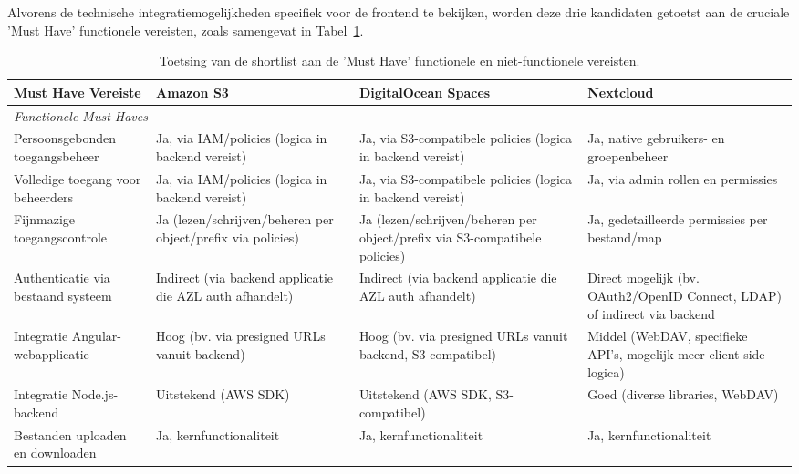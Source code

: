 Alvorens de technische integratiemogelijkheden specifiek voor de frontend te bekijken, worden deze drie kandidaten getoetst aan de cruciale 'Must Have' functionele vereisten, zoals samengevat in Tabel~\ref{tab:musthave-vergelijking}.

\begin{table}[H]
    \centering
    \footnotesize
    \caption[Toetsing shortlist aan Must Have vereisten]{\label{tab:musthave-vergelijking}Toetsing van de shortlist aan de 'Must Have' functionele en niet-functionele vereisten.} %
    \begin{tabular}{l p{3.5cm} p{3.5cm} p{3.5cm}}
      \toprule
      \textbf{Must Have Vereiste} & \textbf{Amazon S3} & \textbf{DigitalOcean Spaces} & \textbf{Nextcloud} \\
      \midrule
      \multicolumn{4}{l}{\textit{Functionele Must Haves}} \\ %
      Persoonsgebonden toegangsbeheer & Ja, via IAM/policies (logica in backend vereist) & Ja, via S3-compatibele policies (logica in backend vereist) & Ja, native gebruikers- en groepenbeheer \\
      \midrule
      Volledige toegang voor beheerders & Ja, via IAM/policies (logica in backend vereist) & Ja, via S3-compatibele policies (logica in backend vereist) & Ja, via admin rollen en permissies \\
      \midrule
      Fijnmazige toegangscontrole & Ja (lezen/schrijven/beheren per object/prefix via policies) & Ja (lezen/schrijven/beheren per object/prefix via S3-compatibele policies) & Ja, gedetailleerde permissies per bestand/map \\
      \midrule
      Authenticatie via bestaand systeem & Indirect (via backend applicatie die AZL auth afhandelt) & Indirect (via backend applicatie die AZL auth afhandelt) & Direct mogelijk (bv. OAuth2/OpenID Connect, LDAP) of indirect via backend \\
      \midrule
      Integratie Angular-webapplicatie & Hoog (bv. via presigned URLs vanuit backend) & Hoog (bv. via presigned URLs vanuit backend, S3-compatibel) & Middel (WebDAV, specifieke API's, mogelijk meer client-side logica) \\
      \midrule
      Integratie Node.js-backend & Uitstekend (AWS SDK) & Uitstekend (AWS SDK, S3-compatibel) & Goed (diverse libraries, WebDAV) \\
      \midrule
      Bestanden uploaden en downloaden & Ja, kernfunctionaliteit & Ja, kernfunctionaliteit & Ja, kernfunctionaliteit \\

\end{tabular}
\end{table}
